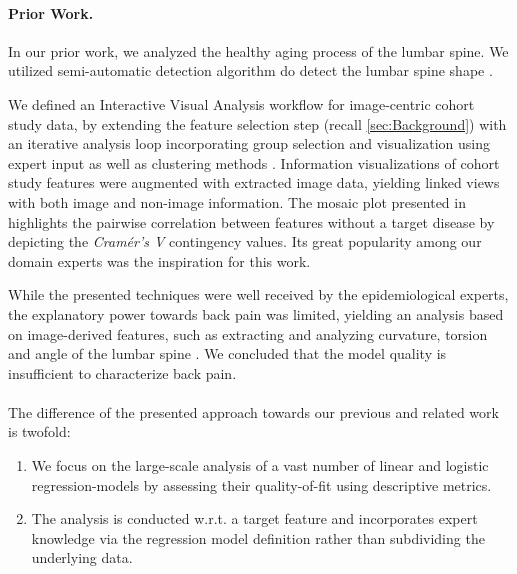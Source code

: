 \documentclass[journal]{style/vgtc} 			          %
\begin{document}
\paragraph{Prior Work.}
In our prior work, we analyzed the healthy aging process of the lumbar spine.
We utilized semi-automatic detection algorithm do detect the lumbar spine shape \cite{Klemm2013VMV}.

We defined an Interactive Visual Analysis workflow for image-centric cohort study data, by extending the feature selection step (recall \ref{sec:Background}) with an iterative analysis loop incorporating group selection and visualization using expert input as well as clustering methods \cite{Klemm2014VIS}.
Information visualizations of cohort study features were augmented with extracted image data, yielding linked views with both image and non-image information.
The mosaic plot presented in \cite{Klemm2014VIS} highlights the pairwise correlation between features without a target disease by depicting the \emph{Cram\'{e}r's V} contingency values.
Its great popularity among our domain experts was the inspiration for this work.

While the presented techniques were well received by the epidemiological experts, the explanatory power towards back pain was limited, yielding an analysis based on image-derived features, such as extracting and analyzing curvature, torsion and angle of the lumbar spine \cite{Klemm2015}.
We concluded that the model quality is insufficient to characterize back pain.
\\\\
The difference of the presented approach towards our previous and related work is twofold:
\begin{enumerate}
	\item We focus on the large-scale analysis of a vast number of linear and logistic regression-models by assessing their quality-of-fit using descriptive metrics.
	\item The analysis is conducted w.r.t. a target feature and incorporates expert knowledge via the regression model definition rather than subdividing the underlying data.
\end{enumerate}
\end{document}
